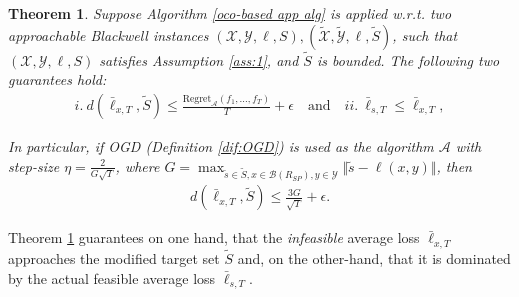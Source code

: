 \documentclass[a4paper,12pt]{article}
\newtheorem{theorem} {Theorem}
\newcommand{\mY}{\mathcal{Y}}
\newcommand{\mX}{\mathcal{X}}
\newcommand{\tS}{\tilde{S}}
\newcommand{\mA}{\mathcal{A}}
\newcommand{\mB}{\mathcal{B}}
\newcommand{\oraclesp}{\mathcal{O}_{SP}}
\begin{document}
\begin{theorem}\label{theorem:oco-based app  alg}
Suppose Algorithm \ref{oco-based app  alg} is applied w.r.t. two approachable Blackwell instances $(\mX, \mY, \ell ,S), (\tilde{\mX}, \tilde{\mY}, \ell ,\tilde{S})$, such that $(\mX,\mY,\ell,S)$ satisfies Assumption \ref{ass:1}, and $\tilde{S}$ is bounded. The following two guarantees hold:
\begin{align}\label{eq:oco-based:1}
i. ~d\left(\bar{\ell}_{x,T} ,  \tS \right) \leq \frac{\text{Regret}_{\mA}(f_1,\dots,f_T)}{T}+ \epsilon \quad \textrm{and} \quad ii. ~\bar{\ell}_{s,T} \leq \bar{\ell}_{x,T},
\end{align}

In particular, if OGD (Definition \ref{dif:OGD}) is used as the algorithm $\mA$ with step-size $\eta =\frac{2}{G\sqrt{T}}$, where %
$G=\max_{\tilde{s}\in \tS, x \in \mB(R_{SP}) ,y\in \mY}\Vert\tilde{s}-\ell(x,y) \Vert$, then
\begin{align*}
d\left(\bar{\ell}_{x,T} ,  \tS \right) \leq \frac{3 G}{\sqrt{T}}+ \epsilon.
\end{align*}
\end{theorem}
Theorem \ref{theorem:oco-based app  alg} guarantees on one hand, that the \textit{infeasible} average loss $\bar{\ell}_{x,T}$ approaches the modified target set $\tS$ and, on the other-hand, that it is dominated by the actual feasible average loss $\bar{\ell}_{s,T}$.
\end{document}
